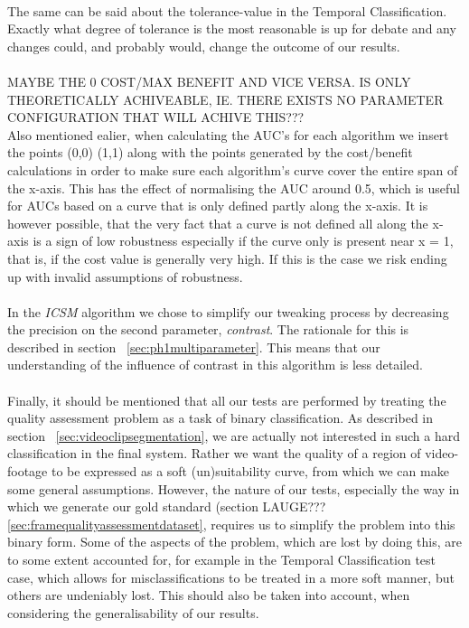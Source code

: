 \\
The same can be said about the tolerance-value in the Temporal Classification. Exactly what degree of tolerance is the most reasonable is up for debate and any changes could, and probably would, change the outcome of our results.\\
\\
MAYBE THE 0 COST/MAX BENEFIT AND VICE VERSA. IS ONLY THEORETICALLY ACHIVEABLE, IE. THERE EXISTS NO PARAMETER CONFIGURATION THAT WILL ACHIVE THIS???\\
Also mentioned ealier, when calculating the AUC's for each algorithm we insert the points (0,0) (1,1) along with the points generated by the cost/benefit calculations in order to make sure each algorithm's curve cover the entire span of the x-axis. This has the effect of normalising the AUC around 0.5, which is useful for AUCs based on a curve that is only defined partly along the x-axis. It is however possible, that the very fact that a curve is not defined all along the x-axis is a sign of low robustness especially if the curve only is present near x = 1, that is, if the cost value is generally very high. If this is the case we risk ending up with invalid assumptions of robustness.\\
\\
In the \textit{ICSM} algorithm we chose to simplify our tweaking process by decreasing the precision on the second parameter, \textit{contrast}. The rationale for this is described in section~ \ref{sec:ph1multiparameter}. This means that our understanding of the influence of contrast in this algorithm is less detailed.\\
\\
Finally, it should be mentioned that all our tests are performed by treating the quality assessment problem as a task of binary classification. As described in section~ \ref{sec:videoclipsegmentation}, we are actually not interested in such a hard classification in the final system. Rather we want the quality of a region of video-footage to be expressed as a soft (un)suitability curve, from which we can make some general assumptions. However, the nature of our tests, especially the way in which we generate our gold standard (section LAUGE??? \ref{sec:framequalityassessmentdataset}, requires us to simplify the problem into this binary form. Some of the aspects of the problem, which are lost by doing this, are to some extent accounted for, for example in the Temporal Classification test case, which allows for misclassifications to be treated in a more soft manner, but others are undeniably lost. This should also be taken into account, when considering the generalisability of our results.
%
